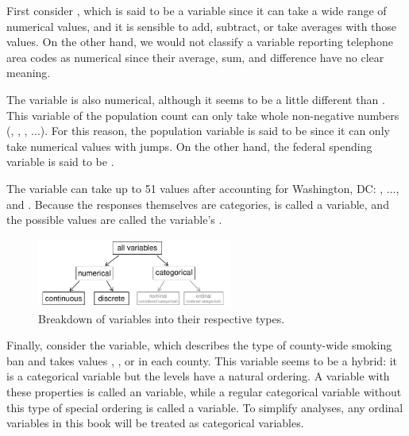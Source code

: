 First consider , which is said to be a  variable since it can take a wide range of numerical values, and it is sensible to add, subtract, or take averages with those values. On the other hand, we would not classify a variable reporting telephone area codes as numerical since their average, sum, and difference have no clear meaning.

The  variable is also numerical, although it seems to be a little different than . This variable of the population count can only take whole non-negative numbers (, , , ...). For this reason, the population variable is said to be  since it can only take numerical values with jumps. On the other hand, the federal spending variable is said to be .

The variable  can take up to 51 values after accounting for Washington, DC: , ..., and . Because the responses themselves are categories,  is called a  variable, and the possible values are called the variable's .

\begin{figure}
\centering
\includegraphics[width=0.57\textwidth]{ch_intro_to_data/figures/variables/variables}
\caption{Breakdown of variables into their respective types.}
\label{variables}
\end{figure}

Finally, consider the  variable, which describes the type of county-wide smoking ban and takes values , , or  in each county. This variable seems to be a hybrid: it is a categorical variable but the levels have a natural ordering. A variable with these properties is called an  variable, while a regular categorical variable without this type of special ordering is called a  variable. To simplify analyses, any ordinal variables in this book will be treated as categorical variables.


